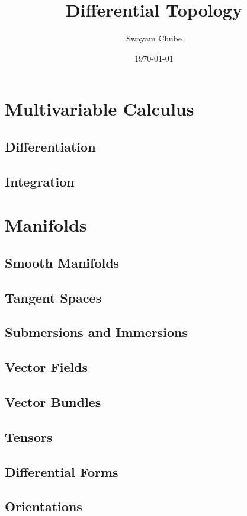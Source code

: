 \documentclass{report}
\title{Differential Topology}
\author{Swayam Chube}
\date{\today}
\begin{document}
\maketitle
\tableofcontents

\part{Multivariable Calculus}
\chapter{Differentiation}


\chapter{Integration}


\part{Manifolds}
\chapter{Smooth Manifolds}


\chapter{Tangent Spaces}


\chapter{Submersions and Immersions}


\chapter{Vector Fields}


\chapter{Vector Bundles}


\chapter{Tensors}


\chapter{Differential Forms}


\chapter{Orientations}

\end{document}

